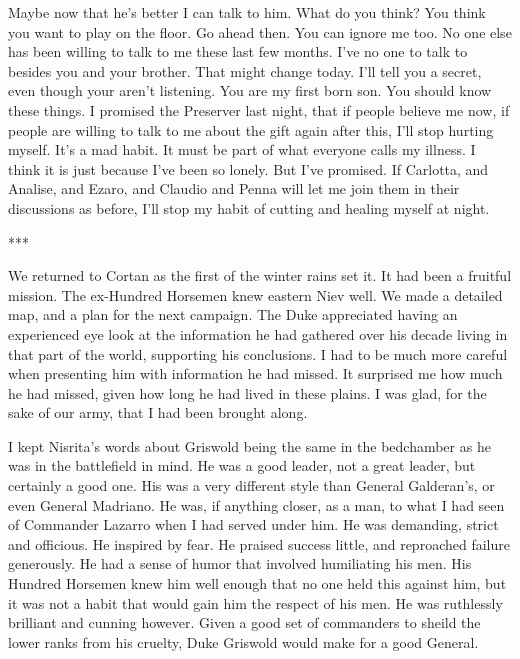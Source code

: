 \documentclass{article}
\begin{document}
Maybe now that he's better I can talk to him. What do you think? You think you want to play on the floor. Go ahead then. You can ignore me too. No one else has been willing to talk to me these last few months. I've no one to talk to besides you and your brother. That might change today. I'll tell you a secret, even though your aren't listening. You are my first born son. You should know these things. I promised the Preserver last night, that if people believe me now, if people are willing to talk to me about the gift again after this, I'll stop hurting myself. It's a mad habit. It must be part of what everyone calls my illness. I think it is just because I've been so lonely. But I've promised. If Carlotta, and Analise, and Ezaro, and Claudio and Penna will let me join them in their discussions as before, I'll stop my habit of cutting and healing myself at night.

***

\vspace{.5cm}

We returned to Cortan as the first of the winter rains set it. It had been a fruitful mission. The ex-Hundred Horsemen knew eastern Niev well. We made a detailed map, and a plan for the next campaign. The Duke appreciated having an experienced eye look at the information he had gathered over his decade living in that part of the world, supporting his conclusions. I had to be much more careful when presenting him with information he had missed. It surprised me how much he had missed, given how long he had lived in these plains. I was glad, for the sake of our army, that I had been brought along.

I kept Nisrita's words about Griswold being the same in the bedchamber as he was in the battlefield in mind. He was a good leader, not a great leader, but certainly a good one. His was a very different style than General Galderan's, or even General Madriano. He was, if anything closer, as a man, to what I had seen of Commander Lazarro when I had served under him. He was demanding, strict and officious. He inspired by fear. He praised success little, and reproached failure generously. He had a sense of humor that involved humiliating his men. His Hundred Horsemen knew him well enough that no one held this against him, but it was not a habit that would gain him the respect of his men. He was ruthlessly brilliant and cunning however. Given a good set of commanders to sheild the lower ranks from his cruelty, Duke Griswold would make for a good General. 
\end{document}

